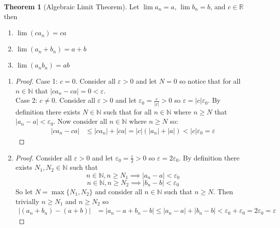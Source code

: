 \documentclass[12pt]{article}
\theoremstyle{definition}
\theoremstyle{definition}
\newtheorem{theorem}{Theorem}
\theoremstyle{definition}
\theoremstyle{definition}
\begin{document}
\begin{flushleft}
\begin{theorem}[Algebraic Limit Theorem]
    Let $\lim a_n = a$, $\lim b_n = b$, and $c \in \mathbb{R}$ then
    \begin{enumerate}
        \item $\lim(ca_n) = ca$
        \item $\lim(a_n + b_n) = a + b$
        \item $\lim(a_nb_n) = ab$
    \end{enumerate}
\end{theorem}
\begin{enumerate}
    \item
    \begin{proof}
        Case 1: $c = 0$. Consider all $\varepsilon > 0$ and let $N = 0$ so notice that for all $n \in \mathbb{N}$ that $|ca_n - ca| = 0 < \varepsilon$. \\
        Case 2: $c \neq 0$. Consider all $\varepsilon > 0$ and let $\varepsilon_0 = \frac{\varepsilon}{|c|} > 0$ so $\varepsilon = |c|\varepsilon_0$. By definition there exists $N \in \mathbb{N}$ such that for all $n \in \mathbb{N}$ where $n \geq N$ that $|a_n - a| < \varepsilon_0$. Now consider all $n \in \mathbb{N}$ where $n \geq N$ so:
        \begin{align*}
            |ca_n - ca|
            &\leq |ca_n| + |ca|
            = |c|(|a_n| + |a|)
            < |c|\varepsilon_0
            = \varepsilon
        \end{align*}
    \end{proof}
    \item
    \begin{proof}
        Consider all $\varepsilon > 0$ and let $\varepsilon_0 = \frac{\varepsilon}{2} > 0$ so $\varepsilon = 2\varepsilon_0$. By definition there exists $N_1, N_2 \in \mathbb{N}$ such that
        \[
            n \in \mathbb{N}, n \geq N_1 \implies |a_n - a| < \varepsilon_0
        \]
        \[
            n \in \mathbb{N}, n \geq N_2 \implies |b_n - b| < \varepsilon_0
        \]
        So let $N = \max\{N_1, N_2\}$ and consider all $n \in \mathbb{N}$ such that $n \geq N$. Then trivially $n \geq N_1$ and $n \geq N_2$ so
        \begin{align*}
            |(a_n + b_n) - (a + b)|
            &= |a_n - a + b_n - b|
            \leq |a_n - a| + |b_n - b|
            < \varepsilon_0 + \varepsilon_0
            = 2\varepsilon_0
            = \varepsilon
        \end{align*}
    \end{proof}

\end{enumerate}
\end{flushleft}
\end{document}
